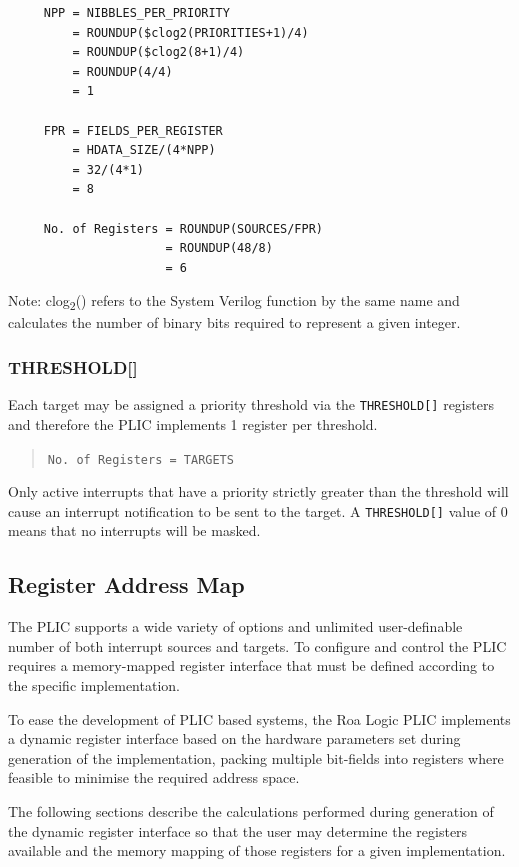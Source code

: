 \begin{verbatim}
     NPP = NIBBLES_PER_PRIORITY
         = ROUNDUP($clog2(PRIORITIES+1)/4)
         = ROUNDUP($clog2(8+1)/4)
         = ROUNDUP(4/4)
         = 1

     FPR = FIELDS_PER_REGISTER
         = HDATA_SIZE/(4*NPP)
         = 32/(4*1)
         = 8
    
     No. of Registers = ROUNDUP(SOURCES/FPR)
                      = ROUNDUP(48/8)
                      = 6
\end{verbatim}

Note: clog\textsubscript{2}() refers to the System Verilog function by
the same name and calculates the number of binary bits required to
represent a given integer.

\subsubsection{THRESHOLD[]}

Each target may be assigned a priority threshold via the
\texttt{THRESHOLD[]} registers and therefore the PLIC
implements 1 register per threshold. 

\begin{quote}
	\texttt{No.\ of\ Registers\ =\ TARGETS}
\end{quote}

Only active interrupts that have a priority strictly greater than the
threshold will cause an interrupt notification to be sent to the target.
A \texttt{THRESHOLD[]} value of 0 means that no interrupts will be masked.

\subsection{Register Address Map}

The PLIC supports a wide variety of options and unlimited user-definable
number of both interrupt sources and targets. To configure and control
the PLIC requires a memory-mapped register interface that must be
defined according to the specific implementation.

To ease the development of PLIC based systems, the Roa Logic PLIC
implements a dynamic register interface based on the hardware parameters
set during generation of the implementation, packing multiple bit-fields
into registers where feasible to minimise the required address space.

The following sections describe the calculations performed during
generation of the dynamic register interface so that the user may
determine the registers available and the memory mapping of those
registers for a given implementation.

